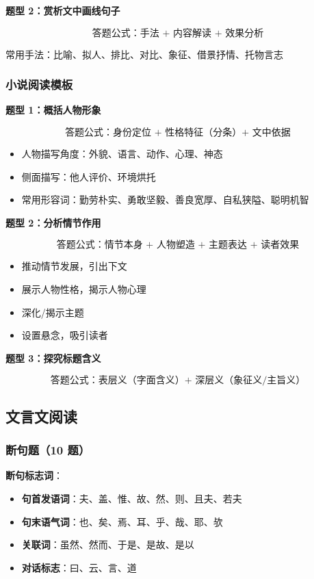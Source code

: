 \textbf{题型 2：赏析文中画线句子}

\[
\text{答题公式：手法 + 内容解读 + 效果分析}
\]

常用手法：比喻、拟人、排比、对比、象征、借景抒情、托物言志

\subsubsection{小说阅读模板}

\textbf{题型 1：概括人物形象}

\[
\text{答题公式：身份定位 + 性格特征（分条）+ 文中依据}
\]

\begin{itemize}
  \item 人物描写角度：外貌、语言、动作、心理、神态
  \item 侧面描写：他人评价、环境烘托
  \item 常用形容词：勤劳朴实、勇敢坚毅、善良宽厚、自私狭隘、聪明机智
\end{itemize}

\textbf{题型 2：分析情节作用}

\[
\text{答题公式：情节本身 + 人物塑造 + 主题表达 + 读者效果}
\]

\begin{itemize}
  \item 推动情节发展，引出下文
  \item 展示人物性格，揭示人物心理
  \item 深化/揭示主题
  \item 设置悬念，吸引读者
\end{itemize}

\textbf{题型 3：探究标题含义}

\[
\text{答题公式：表层义（字面含义）+ 深层义（象征义/主旨义）}
\]

\subsection{文言文阅读}

\subsubsection{断句题（10 题）}

\textbf{断句标志词}：

\begin{itemize}
  \item \textbf{句首发语词}：夫、盖、惟、故、然、则、且夫、若夫
  \item \textbf{句末语气词}：也、矣、焉、耳、乎、哉、耶、欤
  \item \textbf{关联词}：虽然、然而、于是、是故、是以
  \item \textbf{对话标志}：曰、云、言、道
\end{itemize}


